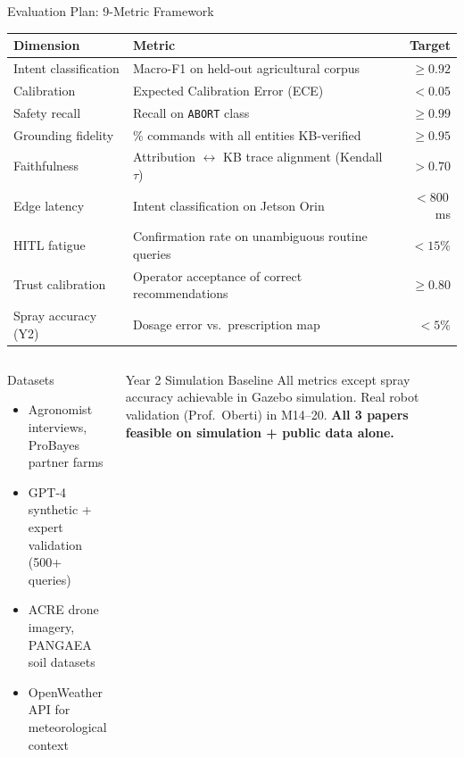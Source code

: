 \documentclass[aspectratio=169,10pt]{beamer}
\begin{document}
\begin{frame}{Evaluation Plan: 9-Metric Framework}

\begin{center}
\small
\begin{tabularx}{\linewidth}{@{}lXr@{}}
\toprule
\textbf{Dimension} & \textbf{Metric} & \textbf{Target} \\
\midrule
Intent classification & Macro-F1 on held-out agricultural corpus & $\geq 0.92$ \\
Calibration & Expected Calibration Error (ECE) & $< 0.05$ \\
Safety recall & Recall on \texttt{ABORT} class & $\geq 0.99$ \\
Grounding fidelity & \% commands with all entities KB-verified & $\geq 0.95$ \\
Faithfulness & Attribution $\leftrightarrow$ KB trace alignment (Kendall $\tau$) & $> 0.70$ \\
Edge latency & Intent classification on Jetson Orin & $< 800$\,ms \\
HITL fatigue & Confirmation rate on unambiguous routine queries & $< 15\%$ \\
Trust calibration & Operator acceptance of correct recommendations & $\geq 0.80$ \\
Spray accuracy (Y2) & Dosage error vs.\ prescription map & $< 5\%$ \\
\bottomrule
\end{tabularx}
\end{center}

\medskip
\begin{columns}[T]
\begin{block}{Datasets}
\small
\begin{itemize}
  \item Agronomist interviews, ProBayes partner farms
  \item GPT-4 synthetic + expert validation (500+ queries)
  \item ACRE drone imagery, PANGAEA soil datasets
  \item OpenWeather API for meteorological context
\end{itemize}
\end{block}

\begin{block}{Year 2 Simulation Baseline}
\small
All metrics except spray accuracy achievable in Gazebo simulation.
Real robot validation (Prof.\ Oberti) in M14--20.
\textbf{All 3 papers feasible on simulation + public data alone.}
\end{block}
\end{columns}

\end{frame}
\end{document}
